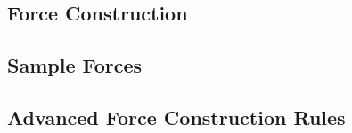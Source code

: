

\subsection{Force Construction}
\label{subsec:force_construction}



\newpage

\subsection{Sample Forces}
\label{subsec:force_construction}



\newpage

\subsection{Advanced Force Construction Rules}





\newpage
